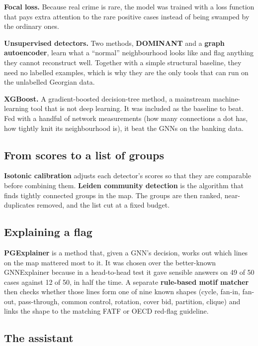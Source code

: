 \documentclass[11pt,a4paper]{article}
\begin{document}
\textbf{Focal loss.} Because real crime is rare, the model was trained with a
loss function that pays extra attention to the rare positive cases instead of
being swamped by the ordinary ones.

\textbf{Unsupervised detectors.} Two methods, \textbf{DOMINANT} and a
\textbf{graph autoencoder}, learn what a ``normal'' neighbourhood looks like and
flag anything they cannot reconstruct well. Together with a simple structural
baseline, they need no labelled examples, which is why they are the only tools
that can run on the unlabelled Georgian data.

\textbf{XGBoost.} A gradient-boosted decision-tree method, a mainstream
machine-learning tool that is not deep learning. It was included as the
baseline to beat. Fed with a handful of network measurements (how many
connections a dot has, how tightly knit its neighbourhood is), it beat the
GNNs on the banking data.

\subsection{From scores to a list of groups}

\textbf{Isotonic calibration} adjusts each detector's scores so that they are
comparable before combining them. \textbf{Leiden community detection} is the
algorithm that finds tightly connected groups in the map. The groups are then
ranked, near-duplicates removed, and the list cut at a fixed budget.

\subsection{Explaining a flag}

\textbf{PGExplainer} is a method that, given a GNN's decision, works out which
lines on the map mattered most to it. It was chosen over the better-known
GNNExplainer because in a head-to-head test it gave sensible answers on 49 of
50 cases against 12 of 50, in half the time. A separate \textbf{rule-based
motif matcher} then checks whether those lines form one of nine known shapes
(cycle, fan-in, fan-out, pass-through, common control, rotation, cover bid,
partition, clique) and links the shape to the matching FATF or OECD red-flag
guideline.

\subsection{The assistant}
\end{document}
